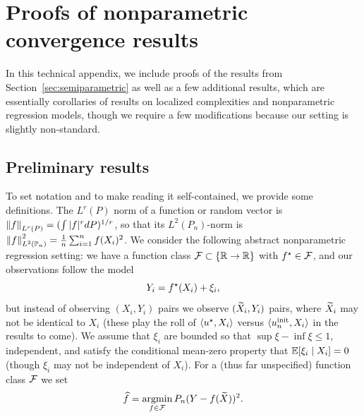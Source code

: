 \section{Proofs of nonparametric convergence results}
\label{sec:proof-nonparametric}

\newcommand{\noise}{\xi}
\newcommand{\localcomplexity}{\mc{R}}


In this technical appendix, we include proofs of the results from
Section~\ref{sec:semiparametric} as well as a few additional results, which
are essentially corollaries of results on localized complexities and
nonparametric regression models, though we require a few modifications
because our setting is slightly non-standard.


\subsection{Preliminary results}

To set notation and to make reading it self-contained, we provide some
definitions. The $L^r(P)$ norm of a function or random vector is
$\left\|{f}\right\|_{L^r(P)} = (\int |f|^r dP)^{1/r}$, so that its $L^2(P_n)$-norm is
$\left\|{f}\right\|_{L^2(\mathbb{P}_n)}^2 = \frac{1}{n} \sum_{i = 1}^n f(X_i)^2$.  We consider the
following abstract nonparametric regression setting: we have a function
class $\mathcal{F} \subset \{\mathbb{R} \to \mathbb{R}\}$ with $f^\star \in \mathcal{F}$, and our
observations follow the model
\begin{equation}
  \label{eqn:nonparametric-model}
  Y_i = f\opt(X_i) + \noise_i,
\end{equation}
but instead of observing $(X_i, Y_i)$ pairs we observe $(\widetilde{X}_i, Y_i)$
pairs, where $\widetilde{X}_i$ may not be identical to $X_i$ (these play the roll
of $\langle u^\star, X_i\rangle$ versus $\langle u_n^{\textup{init}}, X_i\rangle$ in the results to come).  We
assume that $\noise_i$ are bounded so that $\sup \noise - \inf \noise \le
1$, independent, and satisfy the conditional mean-zero property that
$\E[\noise_i \mid X_i] = 0$ (though $\noise_i$ may not be independent of
$X_i$).  For a (thus far unspecified) function class $\mathcal{F}$ we set
\begin{equation*}
  \widehat{f} = \operatorname*{argmin}_{f \in \mathcal{F}} P_n(Y - f(\widetilde{X}))^2.
\end{equation*}

